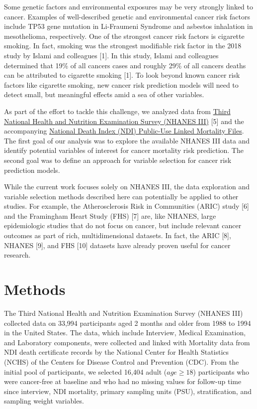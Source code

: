 \documentclass[12pt,oneside]{reedthesis}
\theoremstyle{definition}
\theoremstyle{definition}
\theoremstyle{definition}
\theoremstyle{remark}
\begin{document}
Some genetic factors and environmental exposures may be very strongly
linked to cancer. Examples of well-described genetic and environmental
cancer risk factors include TP53 gene mutation in Li-Fraumeni Syndrome
and asbestos inhalation in mesothelioma, respectively. One of the
strongest cancer risk factors is cigarette smoking. In fact, smoking was
the strongest modifiable risk factor in the 2018 study by Islami and
colleagues {[}1{]}. In this study, Islami and colleagues determined that
19\% of all cancers cases and roughly 29\% of all cancers deaths can be
attributed to cigarette smoking {[}1{]}. To look beyond known cancer
risk factors like cigarette smoking, new cancer risk prediction models
will need to detect small, but meaningful effects amid a sea of other
variables.

As part of the effort to tackle this challenge, we analyzed data from
\href{https://wwwn.cdc.gov/nchs/nhanes/nhanes3/DataFiles.aspx}{Third
National Health and Nutrition Examination Survey (NHANES III)} {[}5{]}
and the accompanying
\href{https://www.cdc.gov/nchs/data-linkage/mortality-public.htm}{National
Death Index (NDI) Public-Use Linked Mortality Files}. The first goal of
our analysis was to explore the available NHANES III data and identify
potential variables of interest for cancer mortality risk prediction.
The second goal was to define an approach for variable selection for
cancer risk prediction models.

While the current work focuses solely on NHANES III, the data
exploration and variable selection methods described here can
potentially be applied to other studies. For example, the
Atherosclerosis Risk in Communities (ARIC) study {[}6{]} and the
Framingham Heart Study (FHS) {[}7{]} are, like NHANES, large
epidemiologic studies that do not focus on cancer, but include relevant
cancer outcomes as part of rich, multidimensional datasets. In fact, the
ARIC {[}8{]}, NHANES {[}9{]}, and FHS {[}10{]} datasets have already
proven useful for cancer research.

\hypertarget{methods}{%
\section*{Methods}\label{methods}}

The Third National Health and Nutrition Examination Survey (NHANES III)
collected data on 33,994 participants aged 2 months and older from 1988
to 1994 in the United States. The data, which include Interview, Medical
Examination, and Laboratory components, were collected and linked with
Mortality data from NDI death certificate records by the National Center
for Health Statistics (NCHS) of the Centers for Disease Control and
Prevention (CDC). From the initial pool of participants, we selected
16,404 adult (\(age \geq 18\)) participants who were cancer-free at
baseline and who had no missing values for follow-up time since
interview, NDI mortality, primary sampling units (PSU), stratification,
and sampling weight variables.
\end{document}
